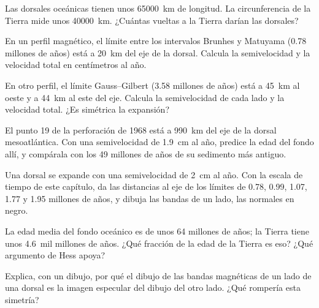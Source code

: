 \begin{exercise}[$\star$]\label{exo:g11:drift-to-spreading:5}
Las dorsales oceánicas tienen unos \qty{65000}{km} de longitud. La
circunferencia de la Tierra mide unos \qty{40000}{km}. ¿Cuántas vueltas a la
Tierra darían las dorsales?
\end{exercise}

\begin{exercise}[$\star\star$]\label{exo:g11:drift-to-spreading:6}
En un perfil magnético, el límite entre los intervalos Brunhes y Matuyama
(\num{0.78} millones de años) está a \qty{20}{km} del eje de la dorsal.
Calcula la semivelocidad y la velocidad total en centímetros al año.
\end{exercise}

\begin{exercise}[$\star\star$]\label{exo:g11:drift-to-spreading:7}
En otro perfil, el límite Gauss--Gilbert (\num{3.58} millones de años) está a
\qty{45}{km} al oeste y a \qty{44}{km} al este del eje. Calcula la
semivelocidad de cada lado y la velocidad total. ¿Es simétrica la expansión?
\end{exercise}

\begin{exercise}[$\star\star$]\label{exo:g11:drift-to-spreading:8}
El punto 19 de la perforación de 1968 está a \qty{990}{km} del eje de la
dorsal mesoatlántica. Con una semivelocidad de \qty{1.9}{cm} al año, predice
la edad del fondo allí, y compárala con los \num{49} millones de años de su
sedimento más antiguo.
\end{exercise}

\begin{exercise}[$\star\star$]\label{exo:g11:drift-to-spreading:9}
Una dorsal se expande con una semivelocidad de \qty{2}{cm} al año. Con la
escala de tiempo de este capítulo, da las distancias al eje de los límites de
0.78, 0.99, 1.07, 1.77 y 1.95 millones de años, y dibuja las bandas de un
lado, las normales en negro.
\end{exercise}

\begin{exercise}[$\star\star$]\label{exo:g11:drift-to-spreading:10}
La edad media del fondo oceánico es de unos \num{64} millones de años; la
Tierra tiene unos \num{4.6}~mil millones de años. ¿Qué fracción de la edad de
la Tierra es eso? ¿Qué argumento de Hess apoya?
\end{exercise}

\begin{exercise}[$\star\star$]\label{exo:g11:drift-to-spreading:11}
Explica, con un dibujo, por qué el dibujo de las bandas magnéticas de un lado
de una dorsal es la imagen especular del dibujo del otro lado. ¿Qué rompería
esta simetría?
\end{exercise}

